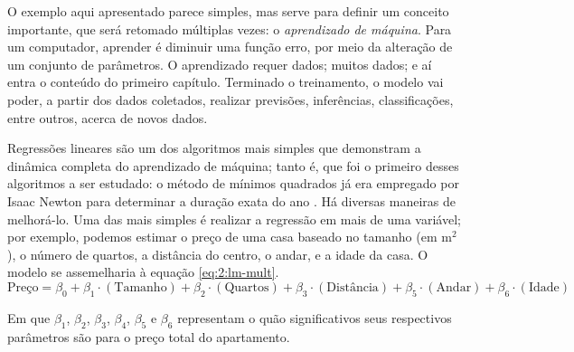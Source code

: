 O exemplo aqui apresentado parece simples, mas serve para definir um conceito importante, que será retomado múltiplas vezes: o \textit{aprendizado de máquina}.
Para um computador, aprender é diminuir uma função erro, por meio da alteração de um conjunto de parâmetros.
O aprendizado requer dados; muitos dados; e aí entra o conteúdo do primeiro capítulo.
Terminado o treinamento, o modelo vai poder, a partir dos dados coletados, realizar previsões, inferências, classificações, entre outros, acerca de novos dados.

Regressões lineares são um dos algoritmos mais simples que demonstram a dinâmica completa do aprendizado de máquina; tanto é, que foi o primeiro desses algoritmos a ser estudado: o método de mínimos quadrados já era empregado por Isaac Newton para determinar a duração exata do ano \cite{belenkiy_groping_2016}.
Há diversas maneiras de melhorá-lo.
Uma das mais simples é realizar a regressão em mais de uma variável; por exemplo, podemos estimar o preço de uma casa baseado no tamanho (em $\text{m}^2$), o número de quartos, a distância do centro, o andar, e a idade da casa.
O modelo se assemelharia à equação \ref{eq:2:lm-mult}.
\begin{equation}
\label{eq:2:lm-mult}
\text{Preço} = \beta_0 + \beta_1 \cdot (\text{Tamanho}) + \beta_2 \cdot (\text{Quartos}) + \beta_3\cdot (\text{Distância}) + \beta_5 \cdot (\text{Andar}) + \beta_6 \cdot (\text{Idade})
\end{equation}

Em que $\beta_1$, $\beta_2$, $\beta_3$, $\beta_4$, $\beta_5$ e $\beta_6$ representam o quão significativos seus respectivos parâmetros são para o preço total do apartamento.

